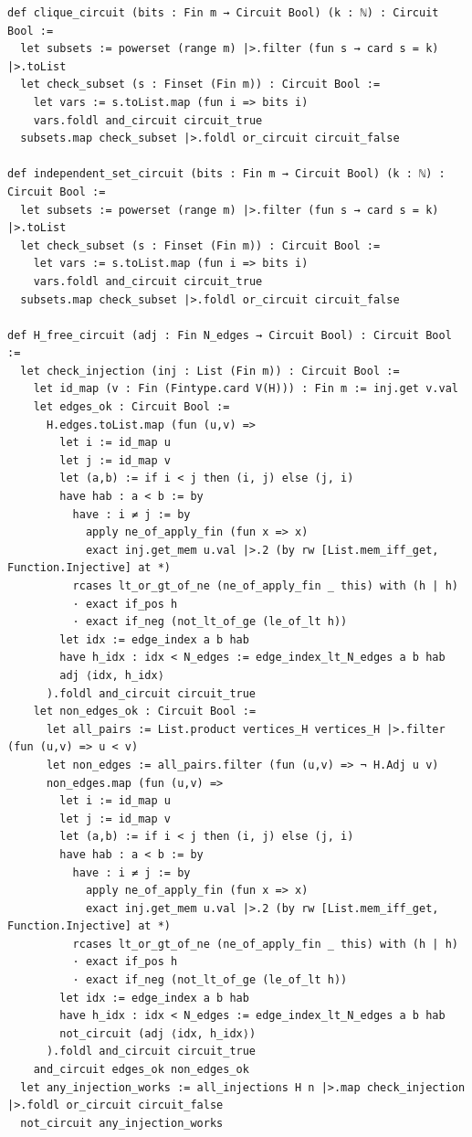\documentclass[11pt,a4paper]{article}
\begin{document}
\begin{lstlisting}[style=lean, caption={SeriesXXVI/ErdosHajnalCircuit.lean (final)}]
def clique_circuit (bits : Fin m → Circuit Bool) (k : ℕ) : Circuit Bool :=
  let subsets := powerset (range m) |>.filter (fun s → card s = k) |>.toList
  let check_subset (s : Finset (Fin m)) : Circuit Bool :=
    let vars := s.toList.map (fun i => bits i)
    vars.foldl and_circuit circuit_true
  subsets.map check_subset |>.foldl or_circuit circuit_false

def independent_set_circuit (bits : Fin m → Circuit Bool) (k : ℕ) : Circuit Bool :=
  let subsets := powerset (range m) |>.filter (fun s → card s = k) |>.toList
  let check_subset (s : Finset (Fin m)) : Circuit Bool :=
    let vars := s.toList.map (fun i => bits i)
    vars.foldl and_circuit circuit_true
  subsets.map check_subset |>.foldl or_circuit circuit_false

def H_free_circuit (adj : Fin N_edges → Circuit Bool) : Circuit Bool :=
  let check_injection (inj : List (Fin m)) : Circuit Bool :=
    let id_map (v : Fin (Fintype.card V(H))) : Fin m := inj.get v.val
    let edges_ok : Circuit Bool :=
      H.edges.toList.map (fun (u,v) =>
        let i := id_map u
        let j := id_map v
        let (a,b) := if i < j then (i, j) else (j, i)
        have hab : a < b := by
          have : i ≠ j := by
            apply ne_of_apply_fin (fun x => x)
            exact inj.get_mem u.val |>.2 (by rw [List.mem_iff_get, Function.Injective] at *)
          rcases lt_or_gt_of_ne (ne_of_apply_fin _ this) with (h | h)
          · exact if_pos h
          · exact if_neg (not_lt_of_ge (le_of_lt h))
        let idx := edge_index a b hab
        have h_idx : idx < N_edges := edge_index_lt_N_edges a b hab
        adj ⟨idx, h_idx⟩
      ).foldl and_circuit circuit_true
    let non_edges_ok : Circuit Bool :=
      let all_pairs := List.product vertices_H vertices_H |>.filter (fun (u,v) => u < v)
      let non_edges := all_pairs.filter (fun (u,v) => ¬ H.Adj u v)
      non_edges.map (fun (u,v) =>
        let i := id_map u
        let j := id_map v
        let (a,b) := if i < j then (i, j) else (j, i)
        have hab : a < b := by
          have : i ≠ j := by
            apply ne_of_apply_fin (fun x => x)
            exact inj.get_mem u.val |>.2 (by rw [List.mem_iff_get, Function.Injective] at *)
          rcases lt_or_gt_of_ne (ne_of_apply_fin _ this) with (h | h)
          · exact if_pos h
          · exact if_neg (not_lt_of_ge (le_of_lt h))
        let idx := edge_index a b hab
        have h_idx : idx < N_edges := edge_index_lt_N_edges a b hab
        not_circuit (adj ⟨idx, h_idx⟩)
      ).foldl and_circuit circuit_true
    and_circuit edges_ok non_edges_ok
  let any_injection_works := all_injections H n |>.map check_injection |>.foldl or_circuit circuit_false
  not_circuit any_injection_works


\end{lstlisting}
\end{document}
